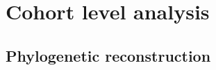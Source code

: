 \cleardoublepage

\section{Cohort level analysis}
\label{cascade-sec:cohortLevel}



\subsection{Phylogenetic reconstruction}
\label{cascade-sec:phylo}

